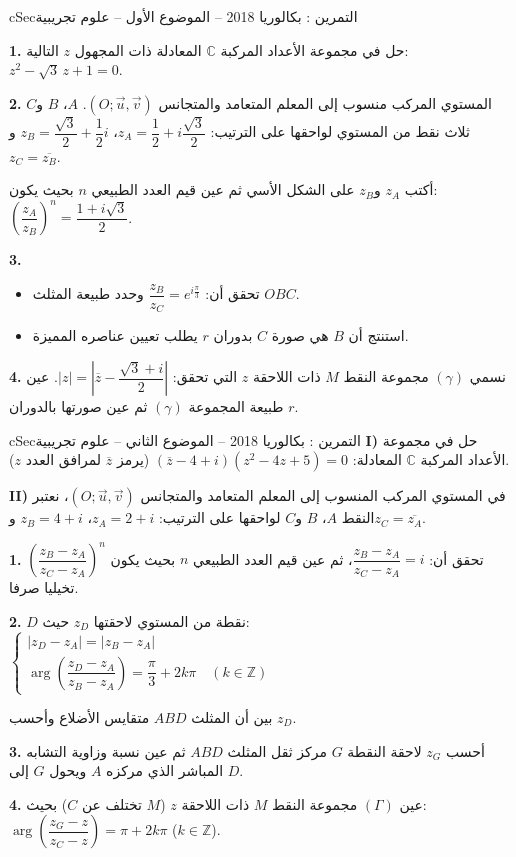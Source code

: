 \documentclass[12pt,a4paper]{article}
\newenvironment{BOX}[2]{\begin{otherlanguage}{english}\begin{arbox}{#1}{#2}}{\end{arbox}\end{otherlanguage}}
\newcounter{exo}
\newenvironment{tamrin}[1]{\stepcounter{exo}\begin{BOX}{cSec}{التمرين \theexo: #1}}{\end{BOX}}
\newenvironment{sq}{\begin{itemize}[leftmargin=2.4em,itemsep=3pt]}{\end{itemize}}
\newcommand{\qa}{\item[(أ)]}\newcommand{\qb}{\item[(ب)]}\newcommand{\qc}{\item[(جـ)]}\newcommand{\qd}{\item[(د)]}\newcommand{\qe}{\item[(هـ)]}
\newcommand{\QQ}[1]{\par\smallskip\textbf{#1.} }
\begin{document}
\begin{tamrin}{بكالوريا 2018 -- الموضوع الأول -- علوم تجريبية}
\QQ{1} حل في مجموعة الأعداد المركبة $\mathbb{C}$ المعادلة ذات المجهول $z$ التالية: $z^2-\sqrt3\,z+1=0$.
\QQ{2} المستوي المركب منسوب إلى المعلم المتعامد والمتجانس $(O;\vec u,\vec v)$. $A$، $B$ و$C$ ثلاث نقط من المستوي لواحقها على الترتيب: $z_A=\dfrac12+i\dfrac{\sqrt3}{2}$، $z_B=\dfrac{\sqrt3}{2}+\dfrac12i$ و$z_C=\overline{z_B}$.

أكتب $z_A$ و$z_B$ على الشكل الأسي ثم عين قيم العدد الطبيعي $n$ بحيث يكون: $\left(\dfrac{z_A}{z_B}\right)^n=\dfrac{1+i\sqrt3}{2}$.
\QQ{3}
\begin{sq}
\qa تحقق أن: $\dfrac{z_B}{z_C}=e^{i\frac{\pi}{3}}$ وحدد طبيعة المثلث $OBC$.
\qb استنتج أن $B$ هي صورة $C$ بدوران $r$ يطلب تعيين عناصره المميزة.
\end{sq}
\QQ{4} نسمي $(\gamma)$ مجموعة النقط $M$ ذات اللاحقة $z$ التي تحقق: $|z|=\left|\overline{z}-\dfrac{\sqrt3+i}{2}\right|$.
عين طبيعة المجموعة $(\gamma)$ ثم عين صورتها بالدوران $r$.
\end{tamrin}

\begin{tamrin}{بكالوريا 2018 -- الموضوع الثاني -- علوم تجريبية}
\textbf{I)} حل في مجموعة الأعداد المركبة $\mathbb{C}$ المعادلة: $\left(\overline{z}-4+i\right)\left(z^2-4z+5\right)=0$ (يرمز $\overline{z}$ لمرافق العدد $z$).

\textbf{II)} في المستوي المركب المنسوب إلى المعلم المتعامد والمتجانس $(O;\vec u,\vec v)$، نعتبر النقط $A$، $B$ و$C$ لواحقها على الترتيب: $z_A=2+i$، $z_B=4+i$ و$z_C=\overline{z_A}$.
\QQ{1} تحقق أن: $\dfrac{z_B-z_A}{z_C-z_A}=i$، ثم عين قيم العدد الطبيعي $n$ بحيث يكون $\left(\dfrac{z_B-z_A}{z_C-z_A}\right)^n$ تخيليا صرفا.
\QQ{2} $D$ نقطة من المستوي لاحقتها $z_D$ حيث:
$\begin{cases}|z_D-z_A|=|z_B-z_A|\\[2pt] \arg\left(\dfrac{z_D-z_A}{z_B-z_A}\right)=\dfrac{\pi}{3}+2k\pi\quad(k\in\mathbb{Z})\end{cases}$

بين أن المثلث $ABD$ متقايس الأضلاع وأحسب $z_D$.
\QQ{3} أحسب $z_G$ لاحقة النقطة $G$ مركز ثقل المثلث $ABD$ ثم عين نسبة وزاوية التشابه المباشر الذي مركزه $A$ ويحول $G$ إلى $D$.
\QQ{4} عين $(\Gamma)$ مجموعة النقط $M$ ذات اللاحقة $z$ ($M$ تختلف عن $C$) بحيث: $\arg\left(\dfrac{z_G-z}{z_C-z}\right)=\pi+2k\pi$ ($k\in\mathbb{Z}$).
\end{tamrin}
\end{document}
